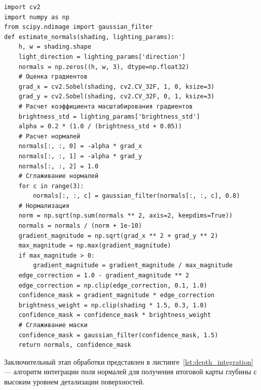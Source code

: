 \begin{center}
    \begin{lstlisting}[label=lst:normals_estimation,caption=Оценка нормалей]
import cv2
import numpy as np
from scipy.ndimage import gaussian_filter
def estimate_normals(shading, lighting_params):
    h, w = shading.shape
    light_direction = lighting_params['direction']
    normals = np.zeros((h, w, 3), dtype=np.float32)
    # Оценка градиентов
    grad_x = cv2.Sobel(shading, cv2.CV_32F, 1, 0, ksize=3)
    grad_y = cv2.Sobel(shading, cv2.CV_32F, 0, 1, ksize=3)
    # Расчет коэффициента масштабирования градиентов
    brightness_std = lighting_params['brightness_std']
    alpha = 0.2 * (1.0 / (brightness_std + 0.05))
    # Расчет нормалей
    normals[:, :, 0] = -alpha * grad_x
    normals[:, :, 1] = -alpha * grad_y
    normals[:, :, 2] = 1.0
    # Сглаживание нормалей
    for c in range(3):
        normals[:, :, c] = gaussian_filter(normals[:, :, c], 0.8)
    # Нормализация
    norm = np.sqrt(np.sum(normals ** 2, axis=2, keepdims=True))
    normals = normals / (norm + 1e-10)
    gradient_magnitude = np.sqrt(grad_x ** 2 + grad_y ** 2)
    max_magnitude = np.max(gradient_magnitude)
    if max_magnitude > 0:
        gradient_magnitude = gradient_magnitude / max_magnitude
    edge_correction = 1.0 - gradient_magnitude ** 2
    edge_correction = np.clip(edge_correction, 0.1, 1.0)
    confidence_mask = gradient_magnitude * edge_correction
    brightness_weight = np.clip(shading * 1.5, 0.3, 1.0)
    confidence_mask = confidence_mask * brightness_weight
    # Сглаживание маски
    confidence_mask = gaussian_filter(confidence_mask, 1.5)
    return normals, confidence_mask
    \end{lstlisting}
\end{center}

Заключительный этап обработки представлен в листинге~\ref{lst:depth_integration} --- алгоритм интеграции поля нормалей для получения итоговой карты глубины с высоким уровнем детализации поверхностей.

